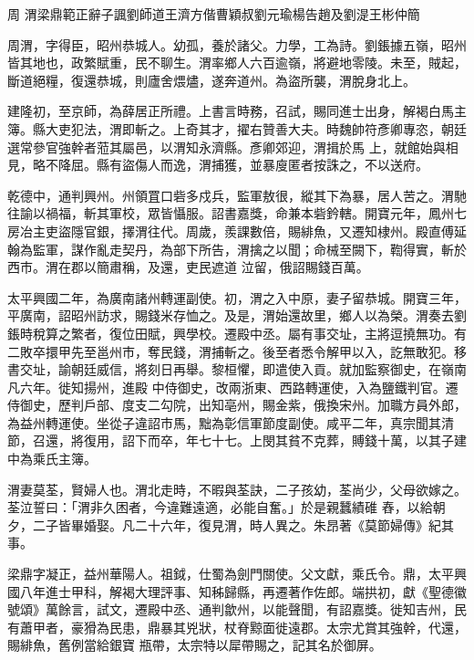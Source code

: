 
\begin{pinyinscope}

 周
 渭梁鼎範正辭子諷劉師道王濟方偕曹穎叔劉元瑜楊告趙及劉湜王彬仲簡



 周渭，字得臣，昭州恭城人。幼孤，養於諸父。力學，工為詩。劉鋹據五嶺，昭州皆其地也，政繁賦重，民不聊生。渭率鄉人六百逾嶺，將避地零陵。未至，賊起，斷道絕糧，復還恭城，則廬舍煨燼，遂奔道州。為盜所襲，渭脫身北上。



 建隆初，至京師，為薛居正所禮。上書言時務，召試，賜同進士出身，解褐白馬主簿。縣大吏犯法，渭即斬之。上奇其才，擢右贊善大夫。時魏帥符彥卿專恣，朝廷選常參官強幹者蒞其屬邑，以渭知永濟縣。彥卿郊迎，渭揖於馬
 上，就館始與相見，略不降屈。縣有盜傷人而逸，渭捕獲，並暴廋匿者按誅之，不以送府。



 乾德中，通判興州。州領罝口砦多戍兵，監軍敖很，縱其下為暴，居人苦之。渭馳往諭以禍福，斬其軍校，眾皆懾服。詔書嘉獎，命兼本砦鈐轄。開寶元年，鳳州七房冶主吏盜隱官銀，擇渭往代。周歲，羨課數倍，賜緋魚，又遷知棣州。殿直傅延翰為監軍，謀作亂走契丹，為部下所告，渭擒之以聞；命械至闕下，鞫得實，斬於西市。渭在郡以簡肅稱，及還，吏民遮道
 泣留，俄詔賜錢百萬。



 太平興國二年，為廣南諸州轉運副使。初，渭之入中原，妻子留恭城。開寶三年，平廣南，詔昭州訪求，賜錢米存恤之。及是，渭始還故里，鄉人以為榮。渭奏去劉鋹時稅算之繁者，復位田賦，興學校。遷殿中丞。屬有事交址，主將逗撓無功。有二敗卒擐甲先至邕州市，奪民錢，渭捕斬之。後至者悉令解甲以入，訖無敢犯。移書交址，諭朝廷威信，將刻日再舉。黎桓懼，即遣使入貢。就加監察御史，在嶺南凡六年。徙知揚州，進殿
 中侍御史，改兩浙東、西路轉運使，入為鹽鐵判官。遷侍御史，歷判戶部、度支二勾院，出知亳州，賜金紫，俄換宋州。加職方員外郎，為益州轉運使。坐從子違詔市馬，黜為彰信軍節度副使。咸平二年，真宗聞其清節，召還，將復用，詔下而卒，年七十七。上閔其貧不克葬，賻錢十萬，以其子建中為乘氏主簿。



 渭妻莫荃，賢婦人也。渭北走時，不暇與荃訣，二子孩幼，荃尚少，父母欲嫁之。荃泣誓曰：「渭非久困者，今違難遠適，必能自奮。」於是親蠶績碓
 舂，以給朝夕，二子皆畢婚娶。凡二十六年，復見渭，時人異之。朱昂著《莫節婦傳》紀其事。



 梁鼎字凝正，益州華陽人。祖鉞，仕蜀為劍門關使。父文獻，乘氏令。鼎，太平興國八年進士甲科，解褐大理評事、知秭歸縣，再遷著作佐郎。端拱初，獻《聖德徽號頌》萬餘言，試文，遷殿中丞、通判歙州，以能聲聞，有詔嘉獎。徙知吉州，民有蕭甲者，豪猾為民患，鼎暴其兇狀，杖脊黥面徙遠郡。太宗尤賞其強幹，代還，賜緋魚，舊例當給銀寶
 瓶帶，太宗特以犀帶賜之，記其名於御屏。




\end{pinyinscope}
